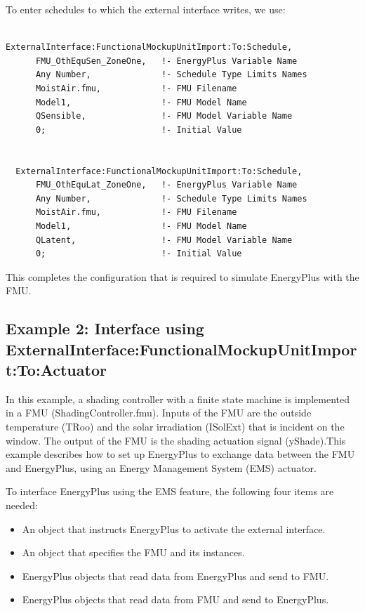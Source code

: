 To enter schedules to which the external interface writes, we use:

\begin{lstlisting}

ExternalInterface:FunctionalMockupUnitImport:To:Schedule,
      FMU_OthEquSen_ZoneOne,   !- EnergyPlus Variable Name
      Any Number,              !- Schedule Type Limits Names
      MoistAir.fmu,            !- FMU Filename
      Model1,                  !- FMU Model Name
      QSensible,               !- FMU Model Variable Name
      0;                       !- Initial Value


  ExternalInterface:FunctionalMockupUnitImport:To:Schedule,
      FMU_OthEquLat_ZoneOne,   !- EnergyPlus Variable Name
      Any Number,              !- Schedule Type Limits Names
      MoistAir.fmu,            !- FMU Filename
      Model1,                  !- FMU Model Name
      QLatent,                 !- FMU Model Variable Name
      0;                       !- Initial Value
\end{lstlisting}

This completes the configuration that is required to simulate EnergyPlus with the FMU.

\subsection{Example 2: Interface using ExternalInterface:FunctionalMockupUnitImport:To:Actuator}\label{example-2-interface-using-externalinterfacefunctionalmockupunitimporttoactuator}

In this example, a shading controller with a finite state machine is implemented in a FMU (ShadingController.fmu). Inputs of the FMU are the outside temperature (TRoo) and the solar irradiation (ISolExt) that is incident on the window. The output of the FMU is the shading actuation signal (yShade).This example describes how to set up EnergyPlus to exchange data between the FMU and EnergyPlus, using an Energy Management System (EMS) actuator.

To interface EnergyPlus using the EMS feature, the following four items are needed:

\begin{itemize}
\item
  An object that instructs EnergyPlus to activate the external interface.
\item
  An object that specifies the FMU and its instances.
\item
  EnergyPlus objects that read data from EnergyPlus and send to FMU.
\item
  EnergyPlus objects that read data from FMU and send to EnergyPlus.
\end{itemize}


